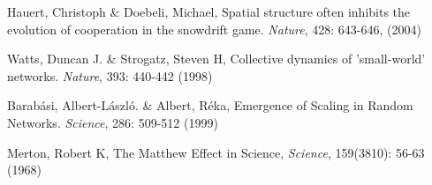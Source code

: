 \begin{thebibliography}{50}
 Hauert, Christoph \& Doebeli, Michael, Spatial
  structure often inhibits the evolution of cooperation in the
  snowdrift game. \textit{Nature}, 428: 643-646,  (2004)
  
 Watts, Duncan J. \& Strogatz, Steven H, Collective dynamics
  of 'small-world' networks. \textit{Nature}, 393: 440-442 (1998)

 Barab\'asi, Albert-L\'aszl\'o. \& Albert, R\'eka, Emergence of
  Scaling in Random Networks. \textit{Science}, 286: 509-512 (1999)



 Merton, Robert K, The Matthew Effect in Science, \textit{Science}, 159(3810): 56-63 (1968)


%
\end{thebibliography}



